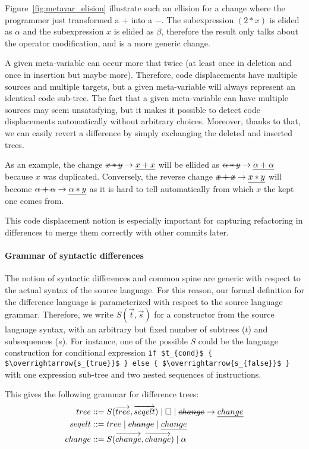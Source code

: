 \documentclass[a4paper,11pt]{article}
\newcommand\typsep{\mathrel{|}}
\newcommand\mathst[1]{\text{\st{$#1$}}}
\newcommand\mathul[1]{\text{\ul{$#1$}}}
\newcommand\id{\square}
\newcommand\change[2]{\mathst{#1} \rightarrow \mathul{#2}}
\begin{document}
Figure~\ref{fig:metavar_elision} illustrate such an ellision for a change where the programmer just transformed a $+$ into a $-$. The subexpression $(2*x)$ is elided as $\alpha$ and the subexpression $x$ is elided as $\beta$, therefore the result only talks about the operator modification, and is a more generic change.

A given meta-variable can occur more that twice (at least once in deletion and once in insertion but maybe more). Therefore, code displacements have multiple sources and multiple targets, but a given meta-variable will always represent an identical code sub-tree. The fact that a given meta-variable can have multiple sources may seem unsatisfying, but it makes it possible to detect code displacements automatically without arbitrary choices. Moreover, thanks to that, we can easily revert a difference by simply exchanging the deleted and inserted trees.

As an example, the change $\change{x*y}{x+x}$ will be ellided as $\change{\alpha*y}{\alpha+\alpha}$ because $x$ was duplicated.
Conversely, the reverse change $\change{x+x}{x*y}$ will become $\change{\alpha+\alpha}{\alpha*y}$ as it is hard to tell automatically from which $x$ the kept one comes from.

This code displacement notion is especially important for capturing refactoring in differences to merge them correctly with other commits later.

\paragraph{Grammar of syntactic differences} The notion of syntactic differences and common spine are generic with
respect to the actual syntax of the source language. For this reason,
our formal definition for the difference language is parameterized
with respect to the source language grammar.  Therefore, we write
$S(\overrightarrow{t}, \overrightarrow{s})$ for a constructor from the
source language syntax, with an arbitrary but fixed number of subtrees
($t$) and subsequences ($s$). For instance, one of the possible $S$
could be the language construction for conditional expression
\lstinline[mathescape]|if $t_{cond}$ { $\overrightarrow{s_{true}}$ } else { $\overrightarrow{s_{false}}$ }|
with one expression sub-tree and two nested sequences of instructions.

This gives the following grammar for difference trees:
\begin{align*}
tree &::= S(\overrightarrow{tree}, \overrightarrow{seqelt}) \typsep \id \typsep \change{change}{change}\\
seqelt &::= tree \typsep \mathst{change} \typsep \mathul{change}\\
change &::= S(\overrightarrow{change}, \overrightarrow{change}) \typsep \alpha\\
\end{align*}
\end{document}
